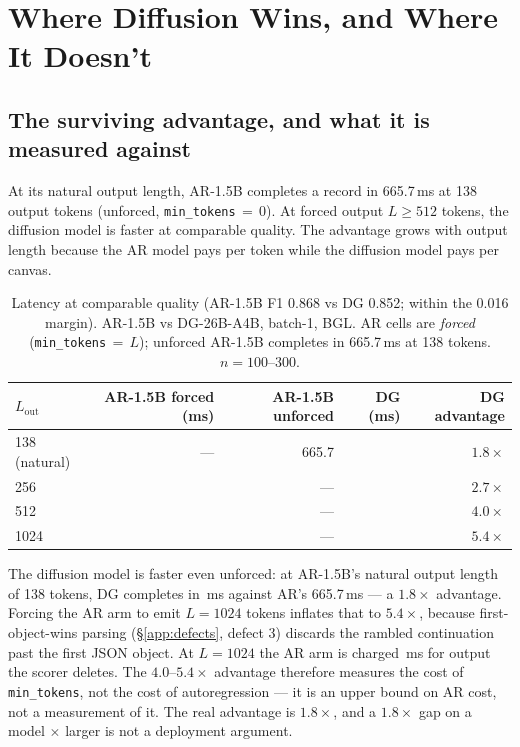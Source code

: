 \section{Where Diffusion Wins, and Where It Doesn't}
\label{sec:fair}

\subsection{The surviving advantage, and what it is measured against}

At its natural output length, AR-1.5B completes a record in 665.7\,ms at
138 output tokens (unforced, \texttt{min\_tokens}\,$=$\,0). At forced
output $L \geq 512$ tokens, the diffusion model is faster at comparable
quality. The advantage grows with output length because the AR model pays
per token while the diffusion model pays per canvas.

\begin{table}[h]
\centering
\caption{Latency at comparable quality (AR-1.5B F1 0.868 vs DG 0.852;
within the 0.016 margin). AR-1.5B vs DG-26B-A4B, batch-1, BGL. AR cells
are \emph{forced} (\texttt{min\_tokens}\,$=$\,$L$); unforced AR-1.5B
completes in 665.7\,ms at 138 tokens. $n{=}100$--$300$.}
\label{tab:niche}
\begin{tabular}{@{}lrrrr@{}}
\toprule
$L_{\mathrm{out}}$ & AR-1.5B forced (ms) & AR-1.5B unforced & DG (ms) & DG advantage \\
\midrule
138 (natural) & --- & 665.7 & \dgTwoFive{} & $1.8\times$ \\
256  & \arOneFiveTwoFive{} & --- & \dgTwoFive{}   & $2.7\times$ \\
512  & \arOneFiveFiveOne{} & --- & \dgFiveOne{}   & $4.0\times$ \\
1024 & \arOneFiveTenTwoFour{} & --- & \dgTenTwoFour{} & $5.4\times$ \\
\bottomrule
\end{tabular}
\end{table}

The diffusion model is faster even unforced: at AR-1.5B's natural output
length of 138 tokens, DG completes in \dgTwoFive\,ms against AR's
665.7\,ms --- a $1.8\times$ advantage. Forcing the AR arm to emit
$L{=}1024$ tokens inflates that to $5.4\times$, because first-object-wins
parsing (\S\ref{app:defects}, defect 3) discards the rambled continuation
past the first JSON object. At $L{=}1024$ the AR arm is charged
\arOneFiveTenTwoFour\,ms for output the scorer deletes. The
$4.0$--$5.4\times$ advantage therefore measures the cost of
\texttt{min\_tokens}, not the cost of autoregression --- it is an upper
bound on AR cost, not a measurement of it. The real advantage is
$1.8\times$, and a $1.8\times$ gap on a model \footprintRatio$\times$
larger is not a deployment argument.

